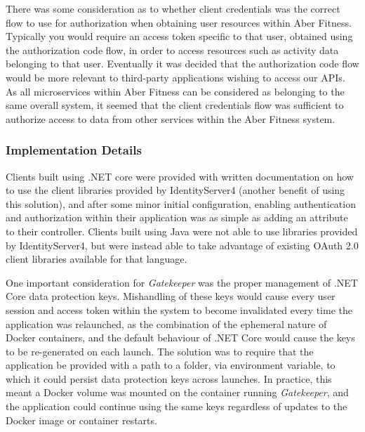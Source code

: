 There was some consideration as to whether client credentials was the correct flow to use for authorization when obtaining user resources within Aber Fitness. Typically you would require an access token specific to that user, obtained using the authorization code flow, in order to access resources such as activity data belonging to that user. Eventually it was decided that the authorization code flow would be more relevant to third-party applications wishing to access our APIs. As all microservices within Aber Fitness can be considered as belonging to the same overall system, it seemed that the client credentials flow was sufficient to authorize access to data from other services within the Aber Fitness system.

\subsubsection{Implementation Details}

Clients built using .NET core were provided with written documentation on how to use the client libraries provided by IdentityServer4 (another benefit of using this solution), and after some minor initial configuration, enabling authentication and authorization within their application was as simple as adding an attribute to their controller. Clients built using Java were not able to use libraries provided by IdentityServer4, but were instead able to take advantage of existing OAuth 2.0 client libraries available for that language.

One important consideration for \textit{Gatekeeper} was the proper management of .NET Core data protection keys. Mishandling of these keys would cause every user session and access token within the system to become invalidated every time the application was relaunched, as the combination of the ephemeral nature of Docker containers, and the default behaviour of .NET Core would cause the keys to be re-generated on each launch. The solution was to require that the application be provided with a path to a folder, via environment variable, to which it could persist data protection keys across launches. In practice, this meant a Docker volume was mounted on the container running \textit{Gatekeeper}, and the application could continue using the same keys regardless of updates to the Docker image or container restarts.

